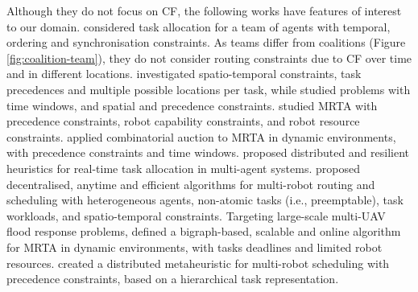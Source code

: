 Although they do not focus on CF, the following works have features of interest to our
domain.
\cite{barbulescu2010} considered task allocation for a team of agents with temporal,
ordering and synchronisation constraints. As teams differ from coalitions (Figure
\ref{fig:coalition-team}), they do not consider routing constraints due to CF over time
and in different locations.
\cite{korsah2011thesis} investigated spatio-temporal constraints, task precedences and
multiple possible locations per task, while \cite{godoy2013,nunes2017} studied
problems with time windows, and spatial and precedence constraints. \cite{maoudj2015}
studied MRTA with precedence constraints, robot capability constraints, and robot resource
constraints.
\cite{nanjanath2010} applied combinatorial auction to MRTA in dynamic environments, with
precedence constraints and time windows.
\cite{whitbrook2015,whitbrook2018,whitbrook2019} proposed distributed and resilient
heuristics for real-time task allocation in multi-agent systems. %
\cite{feo2021} proposed decentralised, anytime and efficient algorithms for multi-robot
routing and scheduling with heterogeneous agents, non-atomic tasks (i.e., preemptable),
task workloads, and spatio-temporal constraints. %
Targeting large-scale multi-UAV flood response problems, \cite{ghassemi2021} defined a
bigraph-based, scalable and online algorithm for MRTA in dynamic environments, with tasks
deadlines and limited robot resources. %
\cite{ferreira2021} created a distributed metaheuristic for multi-robot scheduling with
precedence constraints, based on a hierarchical task representation.

